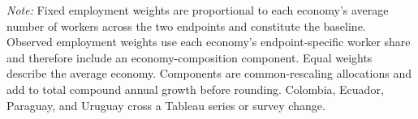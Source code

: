 \begin{table}[htbp]
\centering
\caption{Aggregate annualized decomposition, 2017-Q4--2022-Q4}
\label{tab:latam_regional_decomposition}
\small
{}
\begin{minipage}{0.98\textwidth}
\footnotesize
\textit{Note:} Fixed employment weights are proportional to each economy's average number of workers across the two endpoints and constitute the baseline. Observed employment weights use each economy's endpoint-specific worker share and therefore include an economy-composition component. Equal weights describe the average economy. Components are common-rescaling allocations and add to total compound annual growth before rounding. Colombia, Ecuador, Paraguay, and Uruguay cross a Tableau series or survey change.
\end{minipage}
\end{table}
